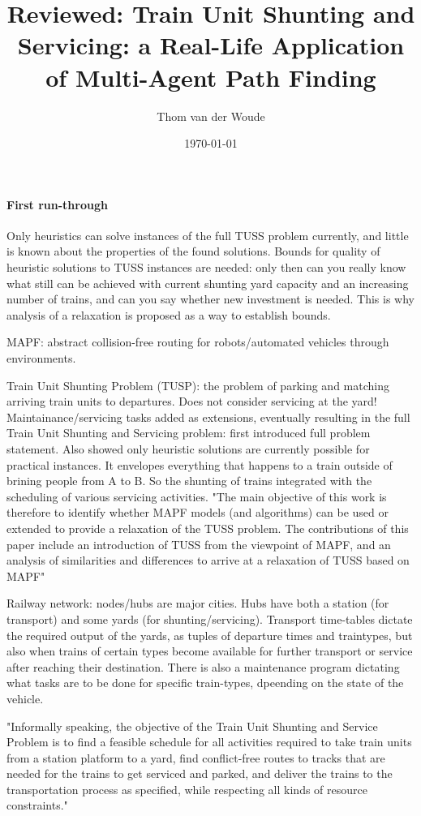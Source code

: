 \documentclass[a4paper,10pt,english]{article}
\title{Reviewed: Train Unit Shunting and Servicing: a Real-Life Application of Multi-Agent Path Finding}
\author{Thom van der Woude}
\date{\today}
\begin{document}
	\maketitle
	\paragraph{First run-through}
	Only heuristics can solve instances of the full TUSS problem currently, and little is known about the properties of the found solutions. Bounds for quality of heuristic solutions to TUSS instances are needed: only then can you really know what still can be achieved with current shunting yard capacity and an increasing number of trains, and can you say whether new investment is needed. This is why analysis of a relaxation is proposed as a way to establish bounds.
	
	MAPF: abstract collision-free routing for robots/automated vehicles through environments.
	
	Train Unit Shunting Problem (TUSP): the problem of parking and matching arriving train units to departures. Does not consider servicing at the yard! Maintainance/servicing tasks added as extensions, eventually resulting in the full Train Unit Shunting and Servicing problem: \cite{Artigues2014} first introduced full problem statement. Also showed only heuristic solutions are currently possible for practical instances. It envelopes everything that happens to a train outside of brining people from A to B. So the shunting of trains integrated with the scheduling of various servicing activities.
	"The  main  objective  of  this  work  is  therefore  to  identify  whether  MAPF models (and algorithms) can be used or extended to provide a relaxation of the TUSS problem. The contributions of this paper include an introduction of TUSS from the viewpoint of MAPF, and an analysis of similarities and differences to arrive at a relaxation of TUSS based on MAPF"
	
	Railway network: nodes/hubs are major cities. Hubs have both a station (for transport) and some yards (for shunting/servicing). Transport time-tables dictate the required output of the yards, as tuples of departure times and traintypes, but also when trains of certain types become available for further transport or service after reaching their destination. There is also a maintenance program dictating what tasks are to be done for specific train-types, dpeending on the state of the vehicle.
	
	"Informally speaking, the objective of the Train  Unit  Shunting  and  Service Problem is  to  find  a  feasible  schedule  for  all  activities  required  to  take  train units from a station platform to a yard, find conflict-free routes to tracks that are needed for the trains to get serviced and parked, and deliver the trains to the  transportation  process  as  specified,  while  respecting  all  kinds  of  resource constraints."
	
\end{document}
